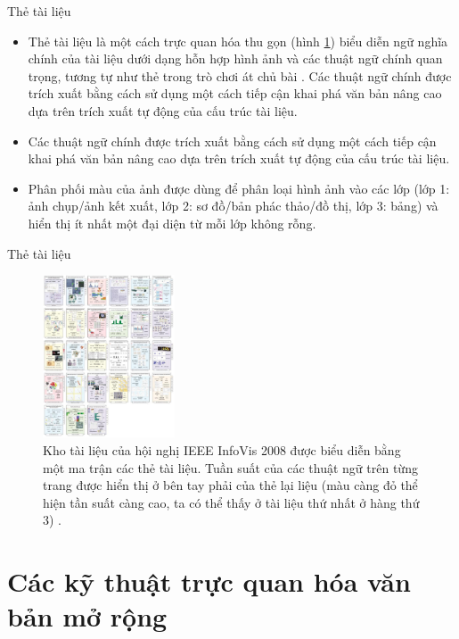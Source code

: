 \documentclass[10pt]{beamer}
\theoremstyle{remark}
\theoremstyle{definition}
\begin{document}
\begin{frame}{Thẻ tài liệu}
	\begin{itemize}
		\item Thẻ tài liệu là một cách trực quan hóa thu gọn (hình \ref{fig:12}) biểu diễn ngữ nghĩa chính của tài liệu dưới dạng hỗn hợp hình ảnh và các thuật ngữ chính quan trọng, tương tự như thẻ trong trò chơi át chủ bài \cite{400}.
		Các thuật ngữ chính được trích xuất bằng cách sử dụng một cách tiếp cận khai phá văn bản nâng cao dựa trên trích xuất tự động của cấu trúc tài liệu.
		\item Các thuật ngữ chính được trích xuất bằng cách sử dụng một cách tiếp cận khai phá văn bản nâng cao dựa trên trích xuất tự động của cấu trúc tài liệu.
		\item Phân phối màu của ảnh được dùng để phân loại hình ảnh vào các lớp (lớp 1: ảnh chụp/ảnh kết xuất, lớp 2: sơ đồ/bản phác thảo/đồ thị, lớp 3: bảng) và hiển thị ít nhất một đại diện từ mỗi lớp không rỗng.
	\end{itemize}
\end{frame}

\begin{frame}{Thẻ tài liệu}
	\begin{figure}[h!]
        \centering
        \includegraphics[width=0.35\textwidth]{12.png}
        \caption{Kho tài liệu của hội nghị IEEE InfoVis 2008 được biểu diễn bằng một ma trận các thẻ tài liệu.
        Tuần suất của các thuật ngữ trên từng trang được hiển thị ở bên tay phải của thẻ lại liệu (màu càng đỏ thể hiện tần suất càng cao, ta có thể thấy ở tài liệu thứ nhất ở hàng thứ 3) \cite{400}.}
        \label{fig:12}
    \end{figure}
\end{frame}

\section{Các kỹ thuật trực quan hóa văn bản mở rộng}
\end{document}
